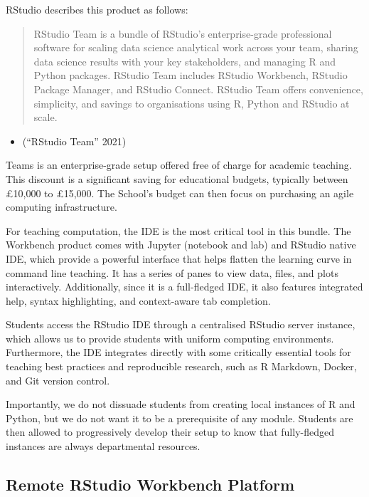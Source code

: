 \documentclass{article}
\begin{document}
RStudio describes this product as follows:

\begin{quote}
RStudio Team is a bundle of RStudio's enterprise-grade professional
software for scaling data science analytical work across your team,
sharing data science results with your key stakeholders, and managing R
and Python packages. RStudio Team includes RStudio Workbench, RStudio
Package Manager, and RStudio Connect. RStudio Team offers convenience,
simplicity, and savings to organisations using R, Python and RStudio at
scale.
\end{quote}

\begin{itemize}
\tightlist
\item
  ({``{RStudio} Team''} 2021)
\end{itemize}

Teams is an enterprise-grade setup offered free of charge for academic
teaching. This discount is a significant saving for educational budgets,
typically between £10,000 to £15,000. The School's budget can then focus
on purchasing an agile computing infrastructure.

For teaching computation, the IDE is the most critical tool in this
bundle. The Workbench product comes with Jupyter (notebook and lab) and
RStudio native IDE, which provide a powerful interface that helps
flatten the learning curve in command line teaching. It has a series of
panes to view data, files, and plots interactively. Additionally, since
it is a full-fledged IDE, it also features integrated help, syntax
highlighting, and context-aware tab completion.

Students access the RStudio IDE through a centralised RStudio server
instance, which allows us to provide students with uniform computing
environments. Furthermore, the IDE integrates directly with some
critically essential tools for teaching best practices and reproducible
research, such as R Markdown, Docker, and Git version control.

Importantly, we do not dissuade students from creating local instances
of R and Python, but we do not want it to be a prerequisite of any
module. Students are then allowed to progressively develop their setup
to know that fully-fledged instances are always departmental resources.

\hypertarget{remote-rstudio-workbench-platform}{%
\subsection{Remote RStudio Workbench
Platform}\label{remote-rstudio-workbench-platform}}
\end{document}
